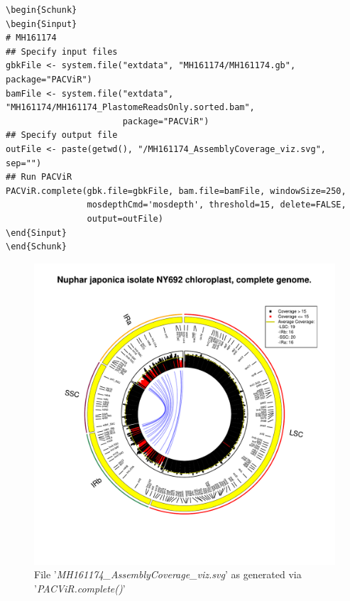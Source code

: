 \documentclass[letterpaper]{article}
\begin{document}
\begin{footnotesize}
\begin{lstlisting}[linerange=\\begin\{Sinput\}-\\end\{Sinput\},includerangemarker=false]
\begin{Schunk}
\begin{Sinput}
# MH161174
## Specify input files
gbkFile <- system.file("extdata", "MH161174/MH161174.gb", package="PACViR")
bamFile <- system.file("extdata", "MH161174/MH161174_PlastomeReadsOnly.sorted.bam", 
                       package="PACViR")
## Specify output file
outFile <- paste(getwd(), "/MH161174_AssemblyCoverage_viz.svg", sep="")
## Run PACViR
PACViR.complete(gbk.file=gbkFile, bam.file=bamFile, windowSize=250, 
                mosdepthCmd='mosdepth', threshold=15, delete=FALSE, 
                output=outFile)
\end{Sinput}
\end{Schunk}
\end{lstlisting}
\end{footnotesize}
  
\begin{figure}[H]
\centering
    \includegraphics{MH161174_AssemblyCoverage_viz.pdf}
    \caption{File '\textit{MH161174\_AssemblyCoverage\_viz.svg}' as generated via '\textit{PACViR.complete()}'}
\centering
\end{figure}
\end{document}
